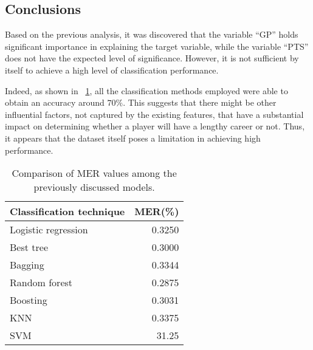 \subsection{Conclusions}

Based on the previous analysis, it was discovered that the variable ``GP'' holds significant importance in explaining the target variable, while the variable ``PTS'' does not have the expected level of significance. 
However, it is not sufficient by itself to achieve a high level of classification performance.

Indeed, as shown in \Tab~\ref{table:ClasEvalParams}, all the classification methods employed were able to obtain an accuracy around $70\%$. This suggests that there might be other influential factors, not captured by the existing features, that have a substantial impact on determining whether a player will have a lengthy career or not. Thus, it appears that the dataset itself poses a limitation in achieving high performance.

\begin{table}[h]
	\centering
	\begin{tabular}{|| l | r ||} 
		\hline
		Classification technique & MER(\%) \\
		\hline
		\hline
		Logistic regression & 0.3250 \\
		\hline
		Best tree & 0.3000 \\
		\hline
		Bagging & 0.3344 \\
		\hline
		Random forest & 0.2875 \\
		\hline
		Boosting & 0.3031 \\
		\hline
		KNN & 0.3375 \\
		\hline
		SVM & 31.25 \\
		\hline
	\end{tabular}
	\caption{Comparison of MER values among the previously discussed models.}
	\label{table:ClasEvalParams}
\end{table}

